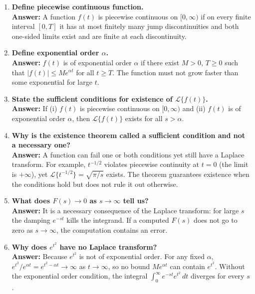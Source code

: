 \documentclass[12pt,a4paper]{article}
\begin{document}
\begin{enumerate}[label=\textbf{Q\arabic*.}]

\item \textbf{Define piecewise continuous function.} \\
\textbf{Answer:} A function $f(t)$ is piecewise continuous on $[0, \infty)$ if on every finite
interval $[0, T]$ it has at most finitely many jump discontinuities and both one-sided limits
exist and are finite at each discontinuity.

\item \textbf{Define exponential order $\alpha$.} \\
\textbf{Answer:} $f(t)$ is of exponential order $\alpha$ if there exist $M > 0$, $T \geq 0$ such
that $|f(t)| \leq M e^{\alpha t}$ for all $t \geq T$. The function must not grow faster than
some exponential for large $t$.

\item \textbf{State the sufficient conditions for existence of $\mathcal{L}\{f(t)\}$.} \\
\textbf{Answer:} If (i) $f(t)$ is piecewise continuous on $[0, \infty)$ and (ii) $f(t)$ is of
exponential order $\alpha$, then $\mathcal{L}\{f(t)\}$ exists for all $s > \alpha$.

\item \textbf{Why is the existence theorem called a sufficient condition and not a necessary one?} \\
\textbf{Answer:} A function can fail one or both conditions yet still have a Laplace transform.
For example, $t^{-1/2}$ violates piecewise continuity at $t = 0$ (the limit is $+\infty$), yet
$\mathcal{L}\{t^{-1/2}\} = \sqrt{\pi/s}$ exists. The theorem guarantees existence when the
conditions hold but does not rule it out otherwise.

\item \textbf{What does $F(s) \to 0$ as $s \to \infty$ tell us?} \\
\textbf{Answer:} It is a necessary consequence of the Laplace transform: for large $s$ the
damping $e^{-st}$ kills the integrand. If a computed $F(s)$ does not go to zero as $s \to \infty$,
the computation contains an error.

\item \textbf{Why does $e^{t^2}$ have no Laplace transform?} \\
\textbf{Answer:} Because $e^{t^2}$ is not of exponential order. For any fixed $\alpha$,
$e^{t^2}/e^{\alpha t} = e^{t^2 - \alpha t} \to \infty$ as $t \to \infty$, so no bound
$M e^{\alpha t}$ can contain $e^{t^2}$. Without the exponential order condition, the integral
$\int_0^\infty e^{-st} e^{t^2}\, dt$ diverges for every $s$.


\end{enumerate}
\end{document}
